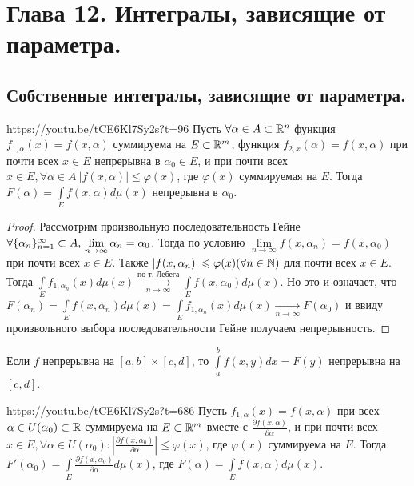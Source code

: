 \newpage
\section{Глава 12. Интегралы, зависящие от параметра.}
\subsection{Собственные интегралы, зависящие от параметра.}
\begin{linkthm}{https://youtu.be/tCE6Kl7Sy2s?t=96}
	Пусть $\forall \alpha\in A\subset \mathbb{R}^n$ функция $f_{1,\alpha}(x)=f(x,\alpha)$ суммируема на $E\subset\mathbb{R}^m$, функция $f_{2,x}(\alpha)=f(x,\alpha)$ при почти всех $x\in E$ непрерывна в $\alpha_0\in E$, и при почти всех $x\in E, \forall\alpha\in A\  |f(x,\alpha)|\leqslant\varphi(x)$, где $\varphi(x)$ суммируемая на $E$. Тогда $F(\alpha)=\int\limits_{E}f(x,\alpha)d\mu(x)$ непрерывна в $\alpha_0$.
\end{linkthm}
\begin{proof}
	Рассмотрим произвольную последовательность Гейне $\forall\{\alpha_n\}_{n=1}^\infty\subset A,\\ \lim\limits_{n\to\infty}\alpha_n=\alpha_0$. Тогда по условию $\lim\limits_{n\to\infty}f(x,\alpha_n)=f(x,\alpha_0)$ при почти всех $x\in E$. Также $|f(x,\alpha_n)|\leqslant \varphi(x) (\forall n\in\mathbb{N})$ для почти всех $x\in E$. Тогда $\int\limits_E f_{1,\alpha_n}(x)d\mu(x)\underset{n\to\infty}{\overset{\text{по т. Лебега}}{\longrightarrow}}\int\limits_{E}f(x,\alpha_0)d\mu(x)$. Но это и означает, что $F(\alpha_n)=\int\limits_{E}f(x,\alpha_n)d\mu(x)=\int\limits_E f_{1,\alpha_n}(x)d\mu(x)\underset{n\to\infty}{\longrightarrow} F(\alpha_0)$ и ввиду произвольного выбора последовательности Гейне получаем непрерывность.
\end{proof}

\begin{corollary}
	Если $f$ непрерывна на $[a,b]\times [c,d]$, то $\int\limits_a^bf(x,y)dx=F(y)$ непрерывна на $[c,d]$.
\end{corollary}

\begin{linkthm}{https://youtu.be/tCE6Kl7Sy2s?t=686}
	Пусть $f_{1,\alpha}(x)=f(x,\alpha)$ при всех $\alpha\in U(\alpha_0)\subset\mathbb{R}$ суммируема на $E\subset \mathbb{R}^m$ вместе с $\frac{\partial f(x,\alpha)}{\partial \alpha}$, и при почти всех $x\in E, \forall\alpha\in U(\alpha_0): \left|\frac{\partial f(x,\alpha_0)}{\partial\alpha}\right|\leqslant\varphi(x)$, где $\varphi(x)$ суммируема на $E$. Тогда $F'(\alpha_0)=\int\limits_E\frac{\partial f(x,\alpha_0)}{\partial\alpha}d\mu(x)$, где $F(\alpha)=\int\limits_E f(x,\alpha)d\mu(x)$.
\end{linkthm}

